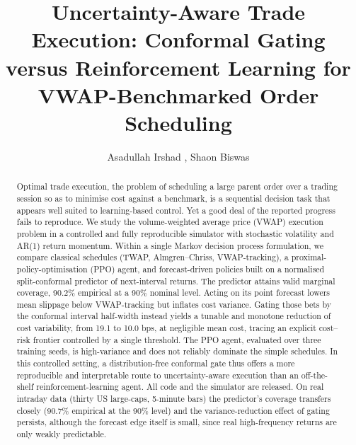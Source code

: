 \documentclass[times]{iapress}
\begin{document}

\title{Uncertainty-Aware Trade Execution: Conformal Gating versus Reinforcement Learning for VWAP-Benchmarked Order Scheduling}

\author{Asadullah Irshad \corrauth,
   Shaon Biswas 
 }

\address{
Centre of Excellence for Data Science, Artificial Intelligence and Modelling (DAIM), University of Hull, UK
}


\begin{abstract}
Optimal trade execution, the problem of scheduling a large parent order over a trading session so as to minimise cost against a benchmark, is a sequential decision task that appears well suited to learning-based control. Yet a good deal of the reported progress fails to reproduce. We study the volume-weighted average price (VWAP) execution problem in a controlled and fully reproducible simulator with stochastic volatility and AR(1) return momentum. Within a single Markov decision process formulation, we compare classical schedules (TWAP, Almgren--Chriss, VWAP-tracking), a proximal-policy-optimisation (PPO) agent, and forecast-driven policies built on a normalised split-conformal predictor of next-interval returns. The predictor attains valid marginal coverage, 90.2\% empirical at a 90\% nominal level. Acting on its point forecast lowers mean slippage below VWAP-tracking but inflates cost variance. Gating those bets by the conformal interval half-width instead yields a tunable and monotone reduction of cost variability, from 19.1 to 10.0 bps, at negligible mean cost, tracing an explicit cost--risk frontier controlled by a single threshold. The PPO agent, evaluated over three training seeds, is high-variance and does not reliably dominate the simple schedules. In this controlled setting, a distribution-free conformal gate thus offers a more reproducible and interpretable route to uncertainty-aware execution than an off-the-shelf reinforcement-learning agent. All code and the simulator are released. On real intraday data (thirty US large-caps, 5-minute bars) the predictor's coverage transfers closely (90.7\% empirical at the 90\% level) and the variance-reduction effect of gating persists, although the forecast edge itself is small, since real high-frequency returns are only weakly predictable.
\end{abstract}
\end{document}
